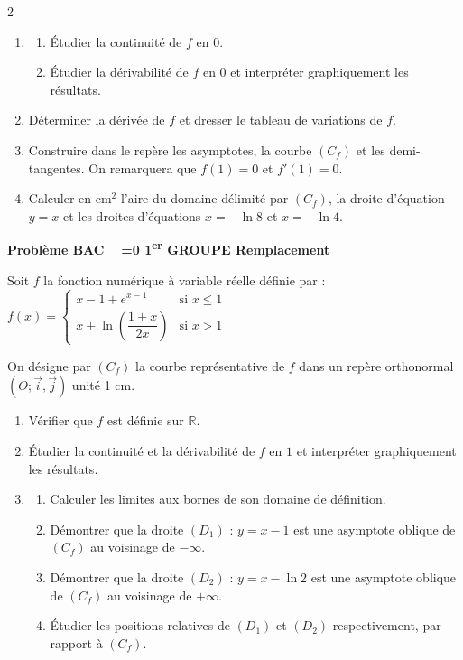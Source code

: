 \documentclass[12pt,a4paper]{article}
\newcounter{probleme}
\newcounter{annee}
\newcounter{session}
\newcommand{\exo}{%
    \refstepcounter{probleme}%
    \par\medskip
    \noindent\textbf{\underline{Problème \theprobleme}\quad
    BAC \theannee\ %
    \ifnum\value{session}=0
        1\textsuperscript{er} GROUPE%
        \setcounter{session}{1}%
    \else
        Remplacement%
        \setcounter{session}{0}%
        \stepcounter{annee}%
    \fi
    }
    \par\medskip
}
\begin{document}
\begin{multicols}{2}
\begin{enumerate}
\item 
\begin{enumerate}
\item Étudier la continuité de $f$ en $0$.
\item Étudier la dérivabilité de $f$ en $0$ et interpréter graphiquement les résultats.
\end{enumerate}

\item Déterminer la dérivée de $f$ et dresser le tableau de variations de $f$.

\item Construire dans le repère les asymptotes, la courbe $(C_f)$ et les demi-tangentes.  
On remarquera que \( f(1)=0 \) et \( f'(1)=0 \).

\item Calculer en cm$^2$ l’aire du domaine délimité par $(C_f)$, la droite d’équation $y=x$ et les droites d’équations $x=-\ln 8$ et $x=-\ln 4$.
\end{enumerate}
\exo

Soit $f$ la fonction numérique à variable réelle définie par :
\(
f(x)=
\begin{cases}
x-1+e^{x-1} & \text{si } x\leq 1 \\[0.3cm]
x+\ln\left(\dfrac{1+x}{2x}\right) & \text{si } x>1
\end{cases}
\)

On désigne par $(C_f)$ la courbe représentative de $f$ dans un repère orthonormal $(O;\vec{i},\vec{j})$ unité 1 cm.

\begin{enumerate}
\item Vérifier que $f$ est définie sur $\mathbb{R}$.

\item Étudier la continuité et la dérivabilité de $f$ en $1$ et interpréter graphiquement les résultats.

\item 
\begin{enumerate}
\item Calculer les limites aux bornes de son domaine de définition.
\item Démontrer que la droite $(D_1)$ : \( y=x-1 \) est une asymptote oblique de $(C_f)$ au voisinage de $-\infty$.
\item Démontrer que la droite $(D_2)$ : \( y=x-\ln 2 \) est une asymptote oblique de $(C_f)$ au voisinage de $+\infty$.
\item Étudier les positions relatives de $(D_1)$ et $(D_2)$ respectivement, par rapport à $(C_f)$.
\end{enumerate}


\end{enumerate}
\end{multicols}
\end{document}
